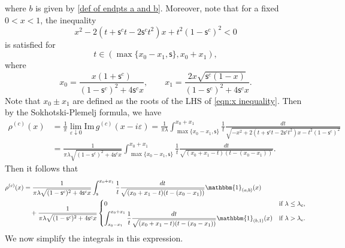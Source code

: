 \documentclass{amsart}
\def\Im{ \mathrm{Im}}
\theoremstyle{plain}
\theoremstyle{remark}
\numberwithin{equation}{section}
\begin{document}
where $b$ is given by \eqref{def of endpts a and b}. 
Moreover, note that for a fixed $0<x<1$, the inequality
\begin{equation}\label{eqn:x inequality}
    x^2-2(t+\mathsf{s}^{c}t -2\mathsf{s}^{c}t^2)x+t^2(1-\mathsf{s}^{c})^2 <0
\end{equation}
is satisfied for 
\begin{equation} 
    t\in (\max\{x_{0}-x_{1},\mathsf{s}\},x_0 +x_1),  
\end{equation}
where 
 \begin{equation}\label{eqn:def of x0x1}
        x_0=\frac{x(1+\mathsf{s}^{c})}{(1-\mathsf{s}^{c})^2 +4\mathsf{s}^{c}x}, \qquad 
        x_1=\frac{2x\sqrt{\mathsf{s}^{c}(1-x)}}{(1-\mathsf{s}^{c})^{2}+ 4 \mathsf{s}^{c}x}.
    \end{equation}
Note that $x_0 \pm x_1$ are defined as the roots of the LHS of \eqref{eqn:x inequality}. 
Then by the Sokhotski-Plemelj formula, we have
\begin{equation}\label{eqn:integral representation of rho}
\begin{split}
    \rho^{(c)}(x)
    &=\frac{1}{\pi}\lim_{\varepsilon\downarrow0}\Im\, g^{(c)}(x-i\varepsilon) =\frac{1}{\pi\lambda}\int_{\max\{x_0-x_1,\mathsf{s}\}}^{x_0 +x_1}\frac{1}{t}\frac{dt}{\sqrt{-x^2 +2(t+\mathsf{s}^{c}t-2\mathsf{s}^{c}t^2)x-t^2(1-\mathsf{s}^{c})^2}}
    \\
    &=\frac{1}{\pi\lambda \sqrt{(1-\mathsf{s}^{c})^2+4\mathsf{s}^{c}x}}\int_{\max\{x_0-x_1,\mathsf{s}\}}^{x_0 +x_1}\frac{1}{t}\frac{dt}{\sqrt{(x_0+x_1 -t)(t-(x_0 -x_1))}}. 
\end{split}
\end{equation}
Then it follows that
\begin{equation}
    \begin{split}
        \rho^{(c)}(x)
        &=\frac{1}{\pi\lambda \sqrt{(1-\mathsf{s}^{c})^2+4\mathsf{s}^{c}x}}\int_{\mathsf{s}}^{x_0 +x_1}\frac{1}{t}\frac{dt}{\sqrt{(x_0+x_1 -t)(t-(x_0 -x_1))}}\mathbbm{1}_{(a,b)}(x)
        \\
        &\quad+\frac{1}{\pi\lambda \sqrt{(1-\mathsf{s}^{c})^2+4\mathsf{s}^{c}x}}
        \begin{cases}
            0 & \textup{if } \lambda \leq\lambda _c ,
            \smallskip 
            \\
            \displaystyle\int_{{x_0-x_1}}^{x_0 +x_1}\frac{1}{t}\frac{dt}{\sqrt{(x_0+x_1 -t)(t-(x_0 -x_1))}}\mathbbm{1}_{(b,1)}(x) &\textup{if } \lambda >\lambda_c. 
        \end{cases}
    \end{split}
\end{equation}
We now simplify the integrals in this expression. 
\end{document}
